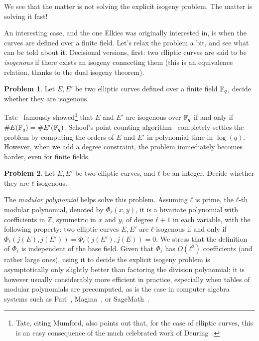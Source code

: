 \documentclass{report}
\theoremstyle{plain}
\theoremstyle{definition}
\newtheorem{problem}{Problem}
\begin{document}
We see that the matter is not solving the explicit isogeny
problem. The matter is solving it fast!

An interesting case, and the one Elkies was originally interested in,
is when the curves are defined over a finite field. %
Let's relax the problem a bit, and see what can be told about it. %
Decisional versions, first: two elliptic curves are said to be
\emph{isogenous} if there exists an isogeny connecting them (this is
an equivalence relation, thanks to the dual isogeny theorem).

\begin{problem}
  \label{prob:isogenous}
  Let $E,E'$ be two elliptic curves defined over a finite field
  $\mathbb{F}_q$, decide whether they are isogenous.
\end{problem}

Tate~\cite[Th.~1(c)]{Tate} famously showed\footnote{Tate, citing
  Mumford, also points out that, for the case of elliptic curves, this
  is an easy consequence of the much celebrated work of
  Deuring~\cite{deuring41}.} that $E$ and $E'$ are isogenous over
$\mathbb{F}_q$ if and only if $\#E(\mathbb{F}_q)=\#E'(\mathbb{F}_q)$. %
Schoof's point counting algorithm~\cite{schoof85,schoof95} completely
settles the problem by computing the orders of $E$ and $E'$ in
polynomial time in $\log(q)$. %
However, when we add a degree constraint, the problem immediately
becomes harder, even for finite fields. %

\begin{problem}
  \label{prob:ell-isogenous}
  Let $E,E'$ be two elliptic curves, and $ℓ$ be an integer. Decide
  whether they are $ℓ$-isogenous.
\end{problem}

The \emph{modular polynomial} helps solve this problem. %
Assuming $ℓ$ is prime, the $ℓ$-th modular polynomial, denoted by
$Φ_ℓ(x,y)$, it is a bivariate polynomial with coefficients in $ℤ$,
symmetric in $x$ and $y$, of degree $ℓ+1$ in each variable, with the
following property: two elliptic curves $E,E'$ are $ℓ$-isogenous if
and only if $Φ_ℓ(j(E),j(E'))=Φ_ℓ(j(E'),j(E))=0$. %
We stress that the definition of $Φ_ℓ$ is independent of the base
field. %
Given that $Φ_ℓ$ has $O(ℓ^2)$ coefficients (and rather large ones),
using it to decide the explicit isogeny problem is asymptotically only
slightly better than factoring the division polynomial; it is however
usually considerably more efficient in practice, especially when
tables of modular polynomials are precomputed, as is the case in
computer algebra systems such as Pari~\cite{Pari}, Magma~\cite{MAGMA},
or SageMath~\cite{Sage}. %
\end{document}
